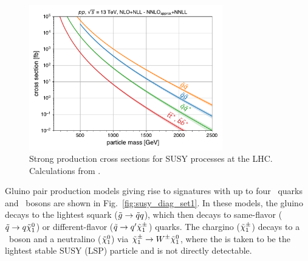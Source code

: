 \begin{figure}[htb!]
    \centering
    \includegraphics[width=0.75\textwidth]{figs/ssan/plot_susy_xsecs}
\caption{Strong production cross sections for SUSY processes at the LHC. Calculations from \cite{THEORY:SUSYxsecs}.}
\label{fig:susy_xsecs}
\end{figure}

Gluino pair production models giving rise to signatures with up to four \cPqb\
quarks and \PW\ bosons are shown in Fig.~\ref{fig:susy_diag_set1}. In
these models, the gluino decays to the lightest squark ($\tilde{g} \to \tilde{q}
q$), which then decays to same-flavor ($\tilde{q} \to q \tilde{\chi}_1^0$) or
different-flavor ($\tilde{q} \to q' \tilde{\chi}_1^{\pm}$) quarks. The chargino
($\tilde{\chi}_1^{\pm}$) decays to a \PW\ boson and a neutralino ($\tilde{\chi}_1^0$) via $\tilde{\chi}_1^{\pm}
\to W^{\pm} \tilde{\chi}_1^0$, where the \lsp is taken to be the lightest stable SUSY (LSP)
particle and is not directly detectable.

